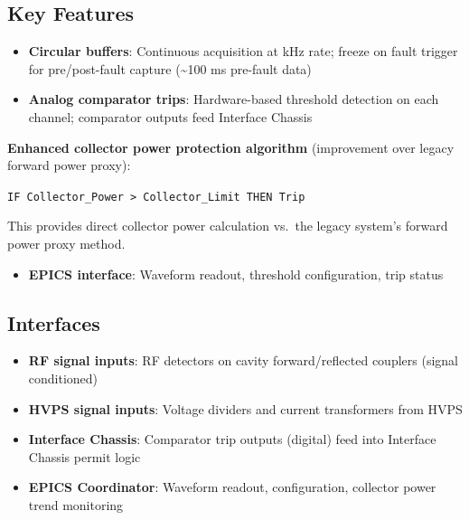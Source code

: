\subsection{Key Features}\label{key-features}

\begin{itemize}
\tightlist
\item
  \textbf{Circular buffers}: Continuous acquisition at kHz rate; freeze on fault trigger for pre/post-fault capture (\textasciitilde100 ms pre-fault data)
\item
  \textbf{Analog comparator trips}: Hardware-based threshold detection on each channel; comparator outputs feed Interface Chassis
\end{itemize}

\textbf{Enhanced collector power protection algorithm} (improvement over legacy forward power proxy):




\texttt{IF\ Collector\_Power\ \textgreater{}\ Collector\_Limit\ THEN\ Trip}

This provides direct collector power calculation vs.~the legacy system's forward power proxy method.

\begin{itemize}
\tightlist
\item
  \textbf{EPICS interface}: Waveform readout, threshold configuration, trip status
\end{itemize}

\subsection{Interfaces}\label{interfaces-1}

\begin{itemize}
\tightlist
\item
  \textbf{RF signal inputs}: RF detectors on cavity forward/reflected couplers (signal conditioned)
\item
  \textbf{HVPS signal inputs}: Voltage dividers and current transformers from HVPS
\item
  \textbf{Interface Chassis}: Comparator trip outputs (digital) feed into Interface Chassis permit logic
\item
  \textbf{EPICS Coordinator}: Waveform readout, configuration, collector power trend monitoring
\end{itemize}

